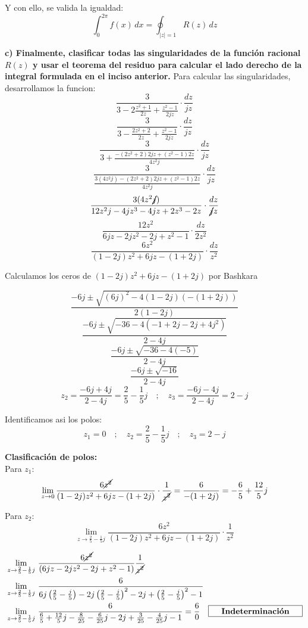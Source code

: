 \documentclass[12pt,a4paper]{report}
\begin{document}
Y con ello, se valida la igualdad:
$$ \int_{0}^{2\pi} f(x) \, dx = \oint_{|z|=1} R(z) \, dz$$ 

\vspace{6cm}

\textbf{c)  Finalmente, clasificar todas las singularidades de la función racional $R(z)$ y usar el teorema del residuo para calcular el lado derecho de la integral formulada en el inciso anterior.}
Para calcular las singularidades, desarrollamos la funcion:
$$\frac{3}{3 - 2\frac{z^{2} + 1}{2z} + \frac{z^{2} - 1}{2jz}} \cdot \frac{dz}{jz}$$ 
$$\frac{3}{3 - \frac{2z^{2} + 2}{2z} + \frac{z^{2} - 1}{2jz}} \cdot \frac{dz}{jz}$$ 
$$\frac{3}{3 + \frac{-(2z^{2} + 2)2jz + (z^2-1)2z}{4z^2j}} \cdot \frac{dz}{jz}$$ 
$$\frac{3}{\frac{3(4z^2j) - (2z^{2} + 2)2jz + (z^2-1)2z}{4z^2j}} \cdot \frac{dz}{jz}$$ 
$$\frac{3(4z^2\cancel{j})}{12z^2j - 4jz^{3} - 4jz + 2z^3 - 2z} \cdot \frac{dz}{\cancel{j}z}$$ 
$$\frac{12z^2}{6jz - 2jz^{2} - 2j + z^2 - 1} \cdot \frac{dz}{2z^2}$$ 
$$\frac{6z^2}{(1- 2j)z^{2} + 6jz - (1 + 2j)} \cdot \frac{dz}{z^2}$$ 

Calculamos los ceros de $(1- 2j)z^{2} + 6jz - (1 + 2j)$ por Bashkara

$$\frac{-6j \pm \sqrt{(6j)^2-4(1-2j)(-(1+2j))}} {2(1-2j)} $$
$$\frac{-6j \pm \sqrt{-36-4(-1+2j-2j+4j^2)}} {2-4j} $$
$$\frac{-6j \pm \sqrt{-36-4(-5)}} {2-4j} $$
$$\frac{-6j \pm \sqrt{-16}} {2-4j} $$
$$z_2 = \frac{-6j + 4j} {2-4j} = \frac{2}{5}-\frac{1}{5}j\quad;\quad z_3 = \frac{-6j - 4j} {2-4j} = 2-j$$

Identificamos asi los polos:
$$z_1=0\quad;\quad z_2=\frac{2}{5}-\frac{1}{5}j \quad;\quad z_3=2-j$$

\vspace{2cm}

\textbf{Clasificación de polos:}\\[6pt]
Para $z_1$:
$$\lim_{z \to 0}\frac{6\cancel{z^2}}{(1- 2j)z^{2} + 6jz - (1 + 2j)} \cdot \frac{1}{\cancel{z^2}}
=\frac{6}{- (1 + 2j)}=-\frac{6}{5}+\frac{12}{5}j$$ 
\begin{center}\end{center}

Para $z_2$:
$$\lim_{z \to \frac{2}{5}-\frac{1}{5}j}\frac{6z^2}{(1- 2j)z^{2} + 6jz - (1 + 2j)} \cdot \frac{1}{z^2}
$$

\begin{align*}
&\lim_{z \to \frac{2}{5}-\frac{1}{5}j}\,\frac{6\cancel{z^2}}{(6jz-2jz^2-2j+z^2-1)}\frac{1}{\cancel{z^2}}\\
& \lim_{z \to \frac{2}{5}-\frac{1}{5}j}\, \frac{6}{6j\left(\frac{2}{5}-\frac{j}{5} \right)-2j\left(\frac{2}{5}-\frac{j}{5} \right)^2-2j+\left(\frac{2}{5}-\frac{j}{5} \right)^2-1}\\
&\lim_{z \to \frac{2}{5}-\frac{1}{5}j}\,\frac{6}{\frac{6}{5}+\frac{12}{5}j-\frac{8}{25}-\frac{6}{25}j-2j+\frac{3}{25}-\frac{4}{25}j-1}=\frac{6}{0} \quad \framebox[4cm][c]{\textbf{Indeterminación}}\\
\end{align*}
\end{document}
